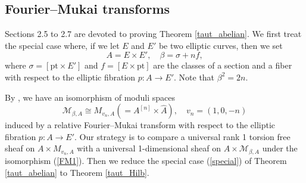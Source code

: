\documentclass[11pt]{amsart}
\theoremstyle{plain}
\theoremstyle{definition}
\theoremstyle{remark}
\newcommand{\BC}{{\mathbb{C}}}
\newcommand{\BQ}{{\mathbb{Q}}}
\newcommand{\CE}{{\mathcal E}}
\newcommand{\CM}{{\mathcal M}}
\begin{document}





\subsection{Fourier--Mukai transforms}\label{Sec2.5} 
Sections 2.5 to 2.7 are devoted to proving Theorem \ref{taut_abelian}. 
We first treat the special case where, if we let  $E$ and $E'$ be two elliptic curves, then we set
\begin{equation}\label{special}
A= E \times E', \quad \beta = \sigma + nf,
\end{equation}
where  $\sigma = [\mathrm{pt} \times E']$ and $f = [E \times \mathrm{pt}]$ are the classes of a section and a fiber with respect to the elliptic fibration $p: A \to E'$. {Note that  $\beta^2=2n$.}


By \cite[Theorem 3.15]{Yo}, we have an isomorphism of  moduli spaces
\begin{equation}\label{FM1}
\CM_{\beta,A} \cong M_{v_n, A}(= A^{[n]} \times \hat{A}),\quad v_n = (1,0,-n)
\end{equation}
induced by a relative Fourier--Mukai transform with respect to the elliptic fibration $p: A \to E'$. Our strategy is to compare a universal rank 1 torsion free sheaf on $A\times M_{v_n, A}$ with a universal 1-dimensional sheaf on $A\times \CM_{\beta,A}$ under the isomorphism (\ref{FM1}). Then we reduce  the special case (\ref{special})
of Theorem \ref{taut_abelian} to Theorem \ref{taut_Hilb}.



\end{document}
